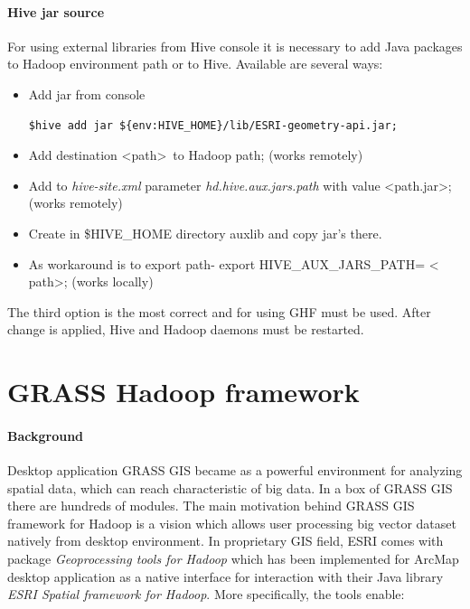 \documentclass[a4paper,12pt,oneside]{report}
\begin{document}
	\paragraph{Hive jar source} For using external libraries from Hive console it is necessary to add Java packages to Hadoop environment path or to Hive. Available are
	several ways:
	\begin{itemize}
		\item Add jar from console 
		\begin{footnotesize}
			\begin{lstlisting}[style=python]
$hive add jar ${env:HIVE_HOME}/lib/ESRI-geometry-api.jar;
			\end{lstlisting}
		\end{footnotesize}
		\item Add destination \textless path\textgreater~to Hadoop path; (works
		remotely)
		\item Add to \textit{hive-site.xml} parameter \textit{hd.hive.aux.jars.path} with
		value \textless path.jar\textgreater; (works remotely)
		\item Create in \$HIVE\_HOME directory auxlib and copy jar's there.
		\item As workaround is to export path-  export HIVE\_AUX\_JARS\_PATH= \textless
		path\textgreater; (works locally)
	\end{itemize}
	The third option is the most correct and for using GHF must be used. After
	change is applied, Hive and Hadoop daemons must be restarted. 





    \section{GRASS Hadoop framework}
    \paragraph{Background}
    Desktop application GRASS GIS became as a powerful environment for analyzing
    spatial data, which can  reach characteristic of big data. In a box of GRASS GIS there are 
    hundreds of modules. The main motivation behind GRASS GIS framework for Hadoop is 
    a vision which allows user
    processing big vector dataset natively from desktop environment. In proprietary GIS field,
    ESRI comes with package \textit{Geoprocessing tools for Hadoop}\cite{ESRI_gtfp} 
    which has been implemented for ArcMap desktop application  as a native interface
    for interaction with  their Java library \textit{ESRI Spatial framework for Hadoop}. More
    specifically, the tools enable:
	
\end{document}
